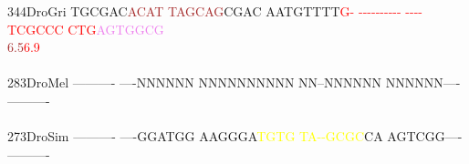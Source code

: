 \documentclass[11pt,twoside,reqno,a4paper]{article}
\begin{document}
{344\hspace*{1\charwidth}DroGri	TGCGAC\textcolor{brown}{A}\textcolor{brown}{C}\textcolor{brown}{A}\textcolor{brown}{T}	\textcolor{brown}{T}\textcolor{brown}{A}\textcolor{brown}{G}\textcolor{brown}{C}\textcolor{brown}{A}\textcolor{brown}{G}CGAC	AATGTTTT\textcolor{red}{G}\textcolor{red}{-}	\textcolor{red}{-}\textcolor{red}{-}\textcolor{red}{-}\textcolor{red}{-}\textcolor{red}{-}\textcolor{red}{-}\textcolor{red}{-}\textcolor{red}{-}\textcolor{red}{-}\textcolor{red}{-}	\textcolor{red}{-}\textcolor{red}{-}\textcolor{red}{-}\textcolor{red}{-}\textcolor{red}{T}\textcolor{red}{C}\textcolor{red}{G}\textcolor{red}{C}\textcolor{red}{C}\textcolor{red}{C}	\textcolor{red}{C}\textcolor{red}{T}\textcolor{red}{G}\textcolor{violet}{A}\textcolor{violet}{G}\textcolor{violet}{T}\textcolor{violet}{G}\textcolor{violet}{G}\textcolor{violet}{C}\textcolor{violet}{G}	\\
\hspace*{4\charwidth}\hspace*{7\charwidth}\hspace*{6\charwidth}\textcolor{brown}{6.5}\hspace*{1\charwidth}\hspace*{1\charwidth}\hspace*{19\charwidth}\textcolor{red}{6.9}\hspace*{1\charwidth}\hspace*{1\charwidth}\hspace*{1\charwidth}\hspace*{1\charwidth}\\
\\
283\hspace*{1\charwidth}DroMel	----------	----NNNNNN	NNNNNNNNNN	NN--NNNNNN	NNNNNN----	----------	\\
\hspace*{4\charwidth}\hspace*{7\charwidth}\hspace*{1\charwidth}\hspace*{1\charwidth}\hspace*{1\charwidth}\hspace*{1\charwidth}\hspace*{1\charwidth}\hspace*{1\charwidth}\\
273\hspace*{1\charwidth}DroSim	----------	----GGATGG	AAGGGA\textcolor{yellow}{T}\textcolor{yellow}{G}\textcolor{yellow}{T}\textcolor{yellow}{G}	\textcolor{yellow}{T}\textcolor{yellow}{A}\textcolor{yellow}{-}\textcolor{yellow}{-}\textcolor{yellow}{G}\textcolor{yellow}{C}\textcolor{yellow}{G}\textcolor{yellow}{C}CA	AGTCGG----	----------	\\
}
\end{document}
